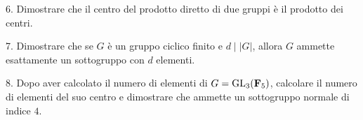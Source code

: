 \item{6.} Dimostrare che il centro del prodotto diretto di due gruppi \`e il prodotto dei centri.
\ve \vs

\item{7.} Dimostrare che se $G$ \`e un gruppo ciclico finito e $d\mid |G|$, allora $G$ ammette esattamente
un sottogruppo con $d$ elementi.
\vv

\item{8.} Dopo aver calcolato il numero di elementi di $G={\rm GL}_3({\bf F}_5)$, calcolare il numero di elementi del suo centro e
dimostrare che ammette un sottogruppo normale di indice $4$.
\ \ve \vs
\bye
